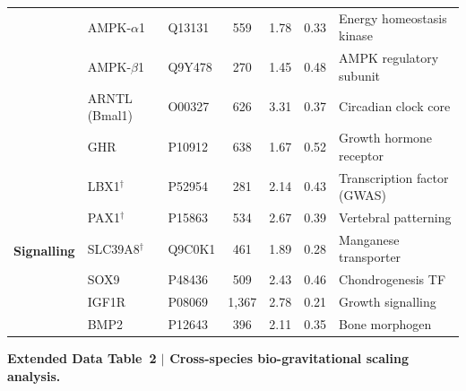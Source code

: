 \documentclass[12pt]{article}
\begin{document}
\begin{landscape}
\begin{center}
{\begin{tabular}{lllcccl}
 & AMPK-$\alpha$1 & Q13131 & 559 & 1.78 & 0.33 & Energy homeostasis kinase \\
 & AMPK-$\beta$1 & Q9Y478 & 270 & 1.45 & 0.48 & AMPK regulatory subunit \\
 & ARNTL (Bmal1) & O00327 & 626 & 3.31 & 0.37 & Circadian clock core \\
 & GHR & P10912 & 638 & 1.67 & 0.52 & Growth hormone receptor \\
\midrule
\multirow{6}{*}{\textbf{Signalling}} 
 & LBX1$^\dagger$ & P52954 & 281 & 2.14 & 0.43 & Transcription factor (GWAS) \\
 & PAX1$^\dagger$ & P15863 & 534 & 2.67 & 0.39 & Vertebral patterning \\
 & SLC39A8$^\dagger$ & Q9C0K1 & 461 & 1.89 & 0.28 & Manganese transporter \\
 & SOX9 & P48436 & 509 & 2.43 & 0.46 & Chondrogenesis TF \\
 & IGF1R & P08069 & 1{,}367 & 2.78 & 0.21 & Growth signalling \\
 & BMP2 & P12643 & 396 & 2.11 & 0.35 & Bone morphogen \\
\bottomrule
\end{tabular}}
\end{center}

\vspace{0.5em}

\vspace{0.5em}

\clearpage
\noindent\textbf{Extended Data Table~2 $\mid$ Cross-species bio-gravitational scaling analysis.}


\end{landscape}
\end{document}
